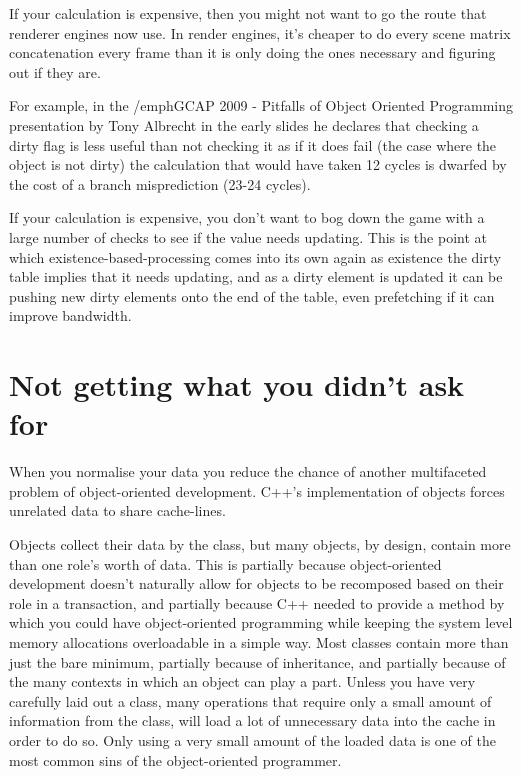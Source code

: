 If your calculation is expensive, then you might not want to go the route that
renderer engines now use. In render engines, it's cheaper to do every scene
matrix concatenation every frame than it is only doing the ones necessary and
figuring out if they are.

For example, in the /emph{GCAP 2009 - Pitfalls of Object Oriented Programming
presentation by Tony Albrecht} in the early slides he declares that checking a
dirty flag is less useful than not checking it as if it does fail (the case
where the object is not dirty) the calculation that would have taken 12 cycles
is dwarfed by the cost of a branch misprediction (23-24 cycles).

If your calculation is expensive, you don't want to bog down the game with
a large number of checks to see if the value needs updating. This is the point
at which existence-based-processing comes into its own again as existence the
dirty table implies that it needs updating, and as a dirty element is
updated it can be pushing new dirty elements onto the end of the table, even
prefetching if it can improve bandwidth.

\section{Not getting what you didn't ask for}

When you normalise your data you reduce the chance of another multifaceted
problem of object-oriented development. C++'s implementation of objects forces
unrelated data to share cache-lines.

Objects collect their data by the class, but many objects, by design, contain
more than one role's worth of data. This is partially because object-oriented
development doesn't naturally allow for objects to be recomposed based on their
role in a transaction, and partially because C++ needed to provide a method by
which you could have object-oriented programming while keeping the system level
memory allocations overloadable in a simple way. Most classes contain more than
just the bare minimum, partially because of inheritance, and partially because
of the many contexts in which an object can play a part. Unless you have very
carefully laid out a class, many operations that require only a small amount of
information from the class, will load a lot of unnecessary data into the cache
in order to do so. Only using a very small amount of the loaded data is one of
the most common sins of the object-oriented programmer.

